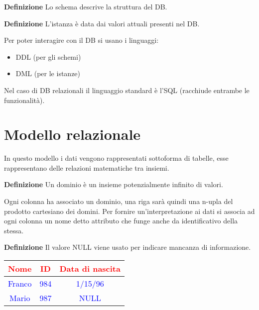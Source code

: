 \documentclass{article}
\begin{document}
\noindent\textbf{Definizione} Lo schema descrive la struttura del DB.\newline

\noindent\textbf{Definizione} L'istanza è data dai valori attuali presenti nel DB.\newline

\noindent Per poter interagire con il DB si usano i linguaggi:
\begin{itemize}
    \item DDL (per gli schemi)
    \item DML (per le istanze)
\end{itemize}

\noindent Nel caso di DB relazionali il linguaggio standard è l'SQL (racchiude entrambe le funzionalità).

\newpage

\section{Modello relazionale}

In questo modello i dati vengono rappresentati sottoforma di tabelle, esse rappresentano delle relazioni matematiche tra insiemi.\newline

\noindent\textbf{Definizione} Un dominio è un insieme potenzialmente infinito di valori.\newline

\noindent Ogni colonna ha associato un dominio, una riga sarà quindi una n-upla del prodotto cartesiano dei domini. Per fornire un'interpretazione ai dati si associa ad ogni colonna un nome detto attributo che funge anche da identificativo della stessa.\newline

\noindent\textbf{Definizione} Il valore NULL viene usato per indicare mancanza di informazione.\newline

\begin{table}[ht]
    \centering
    \begin{tabular}{c|c|c}
        \textcolor{red}{Nome} & \textcolor{red}{ID} & \textcolor{red}{Data di nascita}\\
         \hline
        \textcolor{blue}{Franco} & \textcolor{blue}{984} & \textcolor{blue}{1/15/96}\\
         \hline
        \textcolor{blue}{Mario} & \textcolor{blue}{987} & \textcolor{blue}{NULL}\\
    \end{tabular}
    \label{tab:rel}
\end{table}
\end{document}
